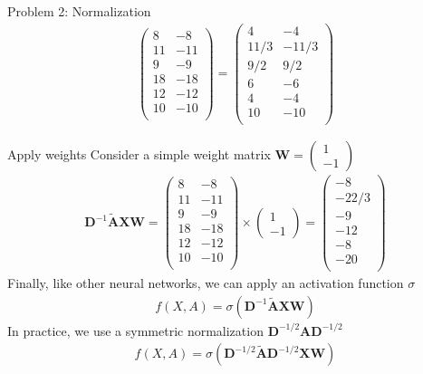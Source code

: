 \documentclass[notheorems, aspectratio=54]{beamer}
\begin{document}
\begin{frame}{Problem 2: Normalization}
\begin{gather*}
\begin{pmatrix}
			8 & -8\\
			11 & -11\\
			9 & -9\\
			18 & -18\\
			12 & -12\\
			10 & -10\\
		\end{pmatrix} =  \begin{pmatrix}
		4 & -4\\
		11/3 & -11/3\\
		9/2 & 9/2\\
		6 & -6\\
		4 & -4\\
		10 & -10\\
		\end{pmatrix}
		\end{gather*}
	\end{frame}
	\begin{frame}{Apply weights}
		Consider a simple weight matrix $\mathbf{W} = \begin{pmatrix}1 \\ -1 \end{pmatrix}$
		\begin{gather*}
			\mathbf{D}^{-1}\widetilde{\mathbf{A}}\mathbf{X}\mathbf{W}
			= \begin{pmatrix}
				8 & -8\\
				11 & -11\\
				9 & -9\\
				18 & -18\\
				12 & -12\\
				10 & -10\\
			\end{pmatrix} \times \begin{pmatrix}1 \\ -1 \end{pmatrix}  = \begin{pmatrix}
			-8\\
			-22/3\\
			-9\\
			-12\\
			-8\\
			-20\\
		\end{pmatrix} 
		\end{gather*}
		Finally, like other neural networks, we can apply an activation function $\sigma$
		\begin{gather*}
			f(X, A) = \sigma(\mathbf{D}^{-1}\widetilde{\mathbf{A}}\mathbf{X}\mathbf{W})
		\end{gather*}
		In practice, we use a symmetric normalization $\mathbf{D}^{-1/2}\mathbf{A}\mathbf{D}^{-1/2}$
		\begin{gather*}
			f(X, A) = \sigma(\mathbf{D}^{-1/2}\widetilde{\mathbf{A}}\mathbf{D}^{-1/2}\mathbf{X}\mathbf{W})
		\end{gather*}
	\end{frame}
\end{document}
